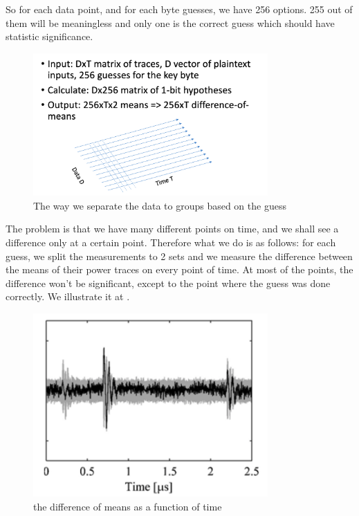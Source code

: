So for each data point, and for each byte guesses, we have 256 options. 255 out
of them will be meaningless and only one is the correct guess which should have
statistic significance.

\begin{figure}[!ht]
    \centering
    \includegraphics[width=0.8\textwidth]{images/Lecture6/dpa-separation-figure.png}
    \caption{The way we separate the data to groups based on the guess} \label{fig:dpa-separation-figure}
\end{figure}

The problem is that we have many different points on time, and we shall see a
difference only at a certain point. Therefore what we do is as follows: for each
guess, we split the measurements to 2 sets and we measure the difference between
the means of their power traces on every point of time. At most of the points,
the difference won't be significant, except to the point where the guess was
done correctly. We illustrate it at .

\begin{figure}[!ht]
    \centering
    \includegraphics[width=0.8\textwidth]{images/Lecture6/meansDiffFigure.png}
    \caption{the difference of means as a function of time}
    \label{fig:meansDiffFigure}
\end{figure}


